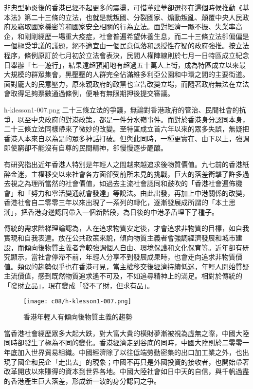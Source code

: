 非典型肺炎後的香港已經不起更多的震盪，可惜董建華卻選擇在這個時候推動《基本法》第二十三條的立法，也就是就叛國、分裂國家、煽動叛亂、顛覆中央人民政府及竊取國家機密等和國家安全相關的行為立法。面對經濟一蹶不振、失業率高企，和剛剛經歷一場重大疫症，社會普遍希望休養生息，而二十三條立法卻偏偏是一個極受爭議的議題，絕不適宜由一個民意低落和認授性存疑的政府強推。按立法程序，條例原訂於七月初於立法會表決，民間人權陣線則於七月一日特區成立紀念日舉辦「七一遊行」，結果遠超預期地有超過五十萬人上街，成為特區成立以來最大規模的群眾集會，黑壓壓的人群完全佔滿維多利亞公園和中環之間的主要街道。面對龐大的民意壓力，原來親政府的政黨也宣告改變立場，而隨著政府無法在立法會取得足夠票數通過條例，便唯有無限期押後提交審議。

h-klesson1-007.png
二十三條立法的爭議，無論對香港政府的管治、民間社會的抗爭，以至中央政府的對港政策，都是一件分水嶺事件。而對於香港身分認同本身，二十三條立法同樣帶來了微妙的改變。至特區成立首六年以來的眾多失誤，無疑把香港人本來自以為是的眾多神話打破。但與此同時，一種更實在、由下以上，強調即使窮卻不能沒有自尊的民間精神，卻慢慢逐步醞釀。

有研究指出近年香港人特別是年輕人之間越來越追求後物質價值。九七前的香港紙醉金迷，主權移交以來社會各方面卻受前所未見的挑戰，巨大的落差衝擊了許多過去視之為理所當然的社會價值，如過去主流社會認同和鼓吹的「香港社會遍佈機會」和「努力和零活變通就會發達」等說法。由此出發，再加上中港關係的改變，香港社會自二零零三年以來出現了一系列的轉化，逐漸發展成所謂的「本土思潮」，把香港身邊認同帶入一個新階段，為日後的中港矛盾埋下了種子。

傳統的需求階梯理論認為，人在追求物質安定後，才會追求非物質的目標，如自我實現和自我表達。放在公共政策來說，傾向物質主義者會強調經濟發展和城市建設，而傾向後物質主義者會較強調個人自由、環境保護和文化保育等。近年卻有研究顯示，當社會停滯不前，年輕人分享不到發展成果時，也會走向追求非物質價值。類似的趨勢似乎也在香港可見，當主權移交後經濟持續低迷，年輕人開始質疑主流價值，感到既然物質追求遙不可及，不如追尋精神上的滿足。相對於傳統的「發財立品」，現在變成「發不了財，但求有品」。

\begin{figure}[htbp]
    \centering
    \texttt{[image: c08/h-klesson1-007.png]}
    \caption{香港年輕人有傾向後物質主義的趨勢} 
\end{figure}

當香港社會經歷眾多大起大跌，對大富大貴的橫財夢漸被視為虛無之際，中國大陸同時卻發生了極為不同的變化。香港經濟走到谷底的同時，中國大陸則於二零零一年底加入世界貿易組織。中國經濟除了以往低端勞動密集的出口加工業之外，也出現了國企和民企「走出去」的現象；中國不再只是外國投資的接收者，也開始帶著改革開放以來賺得的資本到世界各地。中國大陸社會如日中天的自信，與千帆過盡的香港產生巨大落差，形成新一波的身分認同之爭。

